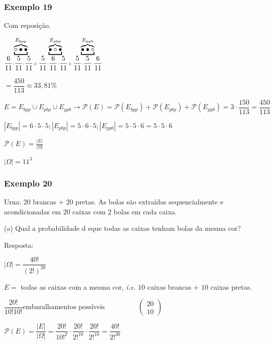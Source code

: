 \documentclass[a4paper]{article}
\begin{document}
	\subsubsection{Exemplo 19} \label{sssec:ex19}
	
	\noindent Com reposição.
	
	$ \underbracket{\overbrace{\circ \bullet \bullet}}^\text{$ E_{bpp} $}_{\dfrac{6}{11} \cdot \dfrac{5}{11} \cdot \dfrac{5}{11}+} \underbracket{\overbrace{\bullet \circ \bullet}}^\text{$ E_{pbp} $}_{\dfrac{5}{11} \cdot \dfrac{6}{11} \cdot \dfrac{5}{11}+} \underbracket{\overbrace{\bullet \bullet \circ}}^\text{$ E_{ppb} $}_{\dfrac{5}{11} \cdot \dfrac{5}{11} \cdot \dfrac{6}{11}} $
	
	$ = \dfrac{450}{113} \approx 33,81\% $
	
	$ E = E_{bpp} \cup E_{pbp} \cup E_{ppb} \rightarrow \mathcal{P}(E) = \mathcal{P}(E_{bpp}) + \mathcal{P}(E_{pbp}) + \mathcal{P}(E_{ppb}) = 3 \cdot \dfrac{150}{113} = \dfrac{450}{113} $
	
	$ |E_{bpp}| = 6 \cdot 5 \cdot 5; |E_{pbp}| = 5 \cdot 6 \cdot 5; |E_{ppb}| = 5 \cdot 5 \cdot 6 = 5 \cdot 5 \cdot 6 $ 
	
	$ \mathcal{P}(E) = \frac{|E|}{|\varOmega|} $
	
	$ |\varOmega| = 11^{3} $
	
	\subsubsection{Exemplo 20}
	
	\noindent Urna: 20 brancas + 20 pretas. As bolas são extraídas sequencialmente e acondicionadas em 20 caixas com 2 bolas em cada caixa.
	
	\noindent (a) Qual a probabilidade d eque todas as caixas tenham bolas da mesma cor?
	
	Resposta:
	
	$ |\varOmega| = \dfrac{40!}{(2!)^{20}} $
	
	$E =$ todas as caixas com a mesma cor, \textit{i.e.} $10$ caixas brancas + $10$ caixas pretas.
	
	$ \dfrac{20!}{10! 10!} \text{embaralhamentos possíveis} \hspace{2cm} \begin{pmatrix}
	20  \\
	10
	\end{pmatrix} $
	
	$ \mathcal{P}(E) = \dfrac{|E|}{|\varOmega|} = \dfrac{20!}{10!^{2}} \cdot \dfrac{20!}{2!^{10}} \cdot \dfrac{20!}{2!^{10}} = \dfrac{40!}{2!^{30}} $
	
\end{document}

